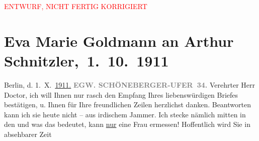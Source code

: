 
\begin{center}
            \textcolor{red}{ENTWURF, NICHT FERTIG KORRIGIERT}
                      \end{center}
            
         
         \renewcommand{\erwaehntePersonen}{Personen: Eva Marie Goldmann, Paul Goldmann, Olga Schnitzler}
         \renewcommand{\erwaehnteInstitutionen}{Institutionen: Lessing-Theater}
         \renewcommand{\erwaehnteOrte}{Orte: Bendlerstraße, Berlin, Schöneberger Ufer, Wien}
         \renewcommand{\erwaehnteWerke}{Werke: Das weite Land. Tragikomödie in fünf Akten, Tagebuch}
               \section[ Eva Marie Goldmann an Arthur Schnitzler, 1. 10. 1911]{ Eva Marie Goldmann an Arthur Schnitzler, 1. 10. 1911}\nopagebreak{}\rehead{ }\begin{ledgroupsized}[t]{13cm}\normalsize\beginnumbering \toendnotes[C]{\smallbreak\pagebreak[2]} 
\toendnotes[C]{\smallbreak}\pstart
           \raggedleft{}{\pb}Berlin, d. 1. X. \uline{1911}\uline{.}\pend
           \pstart
           \textcolor{gray}{\textbf{EG}}\hfill \textcolor{gray}{\textbf{W.
                              SCHÖNEBERGER-UFER 34.}}\pend
           \pstart{}Verehrter Herr Doctor,\pend\pstart
           ich will Ihnen nur rasch den Empfang Ihres liebenswürdigen Briefes bestätigen, u.
               Ihnen für Ihre freundlichen Zeilen herzlichst danken. Beantworten kann ich sie heute nicht – aus irdischem Jammer. {\pb}Ich stecke nämlich mitten in den \label{K_L03541-1v}\label{K_L03541-1h} und was das bedeutet, kann \uline{nur} eine Frau ermessen!\pend
           \pstart
           Hoffentlich wird Sie in absehbarer Zeit \label{K_L03541-2v}
\end{ledgroupsized}
